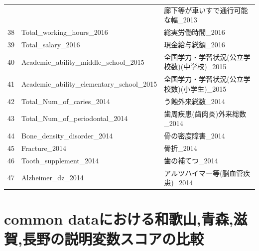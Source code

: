\begin{table}[ht]
\begin{tabular}{rll}
   &  & 廊下等が車いすで通行可能な幅\_2013 \\
  38 & Total\_working\_hours\_2016 & 総実労働時間\_2016 \\
  39 & Total\_salary\_2016 & 現金給与総額\_2016 \\
  40 & Academic\_ability\_middle\_school\_2015 & 全国学力・学習状況(公立学校数)(中学校)\_2015 \\
  41 & Academic\_ability\_elementary\_school\_2015 & 全国学力・学習状況(公立学校数)(小学生)\_2015 \\
  42 & Total\_Num\_of\_caries\_2014 & う蝕外来総数\_2014 \\
  43 & Total\_Num\_of\_periodontal\_2014 & 歯周疾患(歯肉炎)外来総数\_2014 \\
  44 & Bone\_density\_disorder\_2014 & 骨の密度障害\_2014 \\
  45 & Fracture\_2014 & 骨折\_2014 \\
  46 & Tooth\_supplement\_2014 & 歯の補てつ\_2014 \\
  47 & Alzheimer\_dz\_2014 & アルツハイマー等(脳血管疾患)\_2014 \\
   \hline
\end{tabular}
\end{table}









\chapter{common dataにおける和歌山,青森,滋賀,長野の説明変数スコアの比較}





